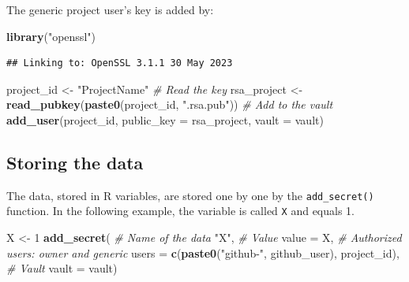 \documentclass[
  12pt,
  american,
  a4paper,
  extrafontsizes,onecolumn,openright
  ]{memoir}
\newenvironment{Shaded}{\begin{snugshade}}{\end{snugshade}}
\newcommand{\AttributeTok}[1]{\textcolor[rgb]{0.13,0.29,0.53}{#1}}
\newcommand{\CommentTok}[1]{\textcolor[rgb]{0.56,0.35,0.01}{\textit{#1}}}
\newcommand{\DecValTok}[1]{\textcolor[rgb]{0.00,0.00,0.81}{#1}}
\newcommand{\FunctionTok}[1]{\textcolor[rgb]{0.13,0.29,0.53}{\textbf{#1}}}
\newcommand{\NormalTok}[1]{#1}
\newcommand{\OtherTok}[1]{\textcolor[rgb]{0.56,0.35,0.01}{#1}}
\newcommand{\StringTok}[1]{\textcolor[rgb]{0.31,0.60,0.02}{#1}}
\begin{document}
\normalsize

The generic project user's key is added by:

\scriptsize

\begin{Shaded}
\begin{Highlighting}[]
\FunctionTok{library}\NormalTok{(}\StringTok{"openssl"}\NormalTok{)}
\end{Highlighting}
\end{Shaded}

\begin{verbatim}
## Linking to: OpenSSL 3.1.1 30 May 2023
\end{verbatim}

\begin{Shaded}
\begin{Highlighting}[]
\NormalTok{project\_id }\OtherTok{\textless{}{-}} \StringTok{"ProjectName"}
\CommentTok{\# Read the key}
\NormalTok{rsa\_project }\OtherTok{\textless{}{-}} \FunctionTok{read\_pubkey}\NormalTok{(}\FunctionTok{paste0}\NormalTok{(project\_id, }\StringTok{".rsa.pub"}\NormalTok{))}
\CommentTok{\# Add to the vault}
\FunctionTok{add\_user}\NormalTok{(project\_id, }\AttributeTok{public\_key =}\NormalTok{ rsa\_project, }\AttributeTok{vault =}\NormalTok{ vault)}
\end{Highlighting}
\end{Shaded}

\normalsize

\subsection{Storing the data}\label{storing-the-data}

The data, stored in R variables, are stored one by one by the \texttt{add\_secret()} function.
In the following example, the variable is called \texttt{X} and equals 1.

\scriptsize

\begin{Shaded}
\begin{Highlighting}[]
\NormalTok{X }\OtherTok{\textless{}{-}} \DecValTok{1}
\FunctionTok{add\_secret}\NormalTok{(}
  \CommentTok{\# Name of the data}
  \StringTok{"X"}\NormalTok{, }
  \CommentTok{\# Value}
  \AttributeTok{value =}\NormalTok{ X, }
  \CommentTok{\# Authorized users: owner and generic}
  \AttributeTok{users =} \FunctionTok{c}\NormalTok{(}\FunctionTok{paste0}\NormalTok{(}\StringTok{"github{-}"}\NormalTok{, github\_user), project\_id), }
  \CommentTok{\# Vault}
  \AttributeTok{vault =}\NormalTok{ vault)}
\end{Highlighting}
\end{Shaded}
\end{document}
